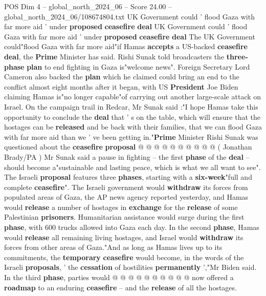 \begin{textsample}{POS Dim 4 – global\_north\_2024\_06 – Score 24.00 – global\_north\_2024\_06/108674804.txt}  \label{ex:f4_pos_137}
UK Government could ' flood Gaza with far more aid ' under \textbf{proposed} \textbf{ceasefire} \textbf{deal} UK Government could ' flood Gaza with far more aid ' under \textbf{proposed} \textbf{ceasefire} \textbf{deal} The UK Government could"flood Gaza with far more aid"if Hamas \textbf{accepts} a US-backed \textbf{ceasefire} \textbf{deal}, the \textbf{Prime} Minister has said.
Rishi Sunak told broadcasters the \textbf{three-phase} \textbf{plan} to end fighting in Gaza is"welcome news".
Foreign Secretary Lord Cameron also backed the \textbf{plan} which he claimed could bring an end to the conflict almost eight months after it began, with US \textbf{President} Joe Biden claiming Hamas is"no longer capable"of carrying out another large-scale attack on Israel.
On the campaign trail in Redcar, Mr Sunak said :"I hope Hamas take this opportunity to conclude the \textbf{deal} that ' s on the table, which will ensure that the hostages can be \textbf{released} and be back with their families, that we can flood Gaza with far more aid than we ' ve been getting in."\textbf{Prime} Minister Rishi Sunak was questioned about the \textbf{ceasefire} \textbf{proposal} @ @ @ @ @ @ @ @ @ @ ( Jonathan Brady/PA ) Mr Sunak said a pause in fighting -- the first \textbf{phase} of the \textbf{deal} -- should become a"sustainable and lasting peace, which is what we all want to see".
The Israeli \textbf{proposal} features three \textbf{phases}, starting with a \textbf{six-week}"full and complete \textbf{ceasefire}".
The Israeli government would \textbf{withdraw} its forces from populated areas of Gaza, the AP news agency reported yesterday, and Hamas would \textbf{release} a number of hostages in \textbf{exchange} for the \textbf{release} of some Palestinian \textbf{prisoners}.
Humanitarian assistance would surge during the first \textbf{phase}, with 600 trucks allowed into Gaza each day.
In the second \textbf{phase}, Hamas would \textbf{release} all remaining living hostages, and Israel would \textbf{withdraw} its forces from other areas of Gaza."And as long as Hamas lives up to its commitments, the \textbf{temporary} \textbf{ceasefire} would become, in the words of the Israeli \textbf{proposals}, ' the \textbf{cessation} of hostilities \textbf{permanently} ',"Mr Biden said.
In the third \textbf{phase}, parties would @ @ @ @ @ @ @ @ @ @ now offered a \textbf{roadmap} to an enduring \textbf{ceasefire} -- and the \textbf{release} of all the hostages.

\end{textsample}
